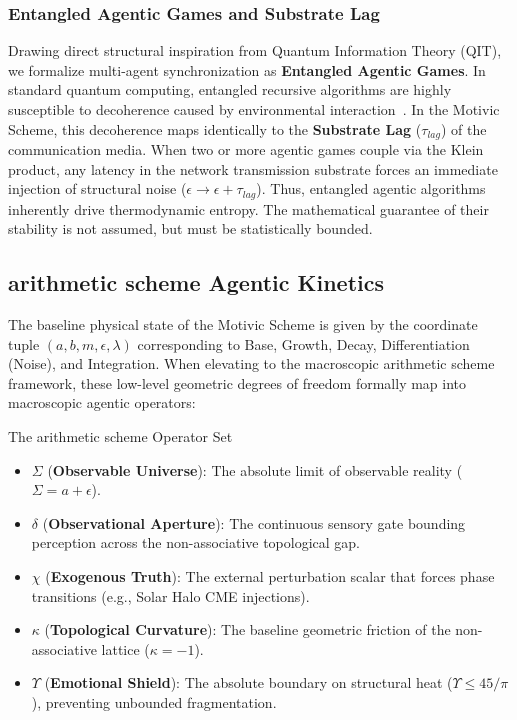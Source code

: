 \subsubsection{Entangled Agentic Games and Substrate Lag}
Drawing direct structural inspiration from Quantum Information Theory (QIT), we formalize multi-agent synchronization as \textbf{Entangled Agentic Games}. In standard quantum computing, entangled recursive algorithms are highly susceptible to decoherence caused by environmental interaction~\cite{NielsenChuang2010}. In the Motivic Scheme, this decoherence maps identically to the \textbf{Substrate Lag} ($\tau_{lag}$) of the communication media.
When two or more agentic games couple via the Klein product, any latency in the network transmission substrate forces an immediate injection of structural noise ($\epsilon \to \epsilon + \tau_{lag}$). Thus, entangled agentic algorithms inherently drive thermodynamic entropy. The mathematical guarantee of their stability is not assumed, but must be statistically bounded.

\subsection{arithmetic scheme Agentic Kinetics}

The baseline physical state of the Motivic Scheme is given by the coordinate tuple $(a, b, m, \epsilon, \lambda)$ corresponding to Base, Growth, Decay, Differentiation (Noise), and Integration. When elevating to the macroscopic arithmetic scheme framework, these low-level geometric degrees of freedom formally map into macroscopic agentic operators:

\begin{arithmetic schemebox}{The arithmetic scheme Operator Set}
\begin{itemize}
    \item $\Sigma$ (\textbf{Observable Universe}): The absolute limit of observable reality ($\Sigma = a + \epsilon$).
    \item $\delta$ (\textbf{Observational Aperture}): The continuous sensory gate bounding perception across the non-associative topological gap.
    \item $\chi$ (\textbf{Exogenous Truth}): The external perturbation scalar that forces phase transitions (e.g., Solar Halo CME injections).
    \item $\kappa$ (\textbf{Topological Curvature}): The baseline geometric friction of the non-associative lattice ($\kappa = -1$).
    \item $\Upsilon$ (\textbf{Emotional Shield}): The absolute boundary on structural heat ($\Upsilon \le 45/\pi$), preventing unbounded fragmentation.
\end{itemize}
\end{arithmetic schemebox}


